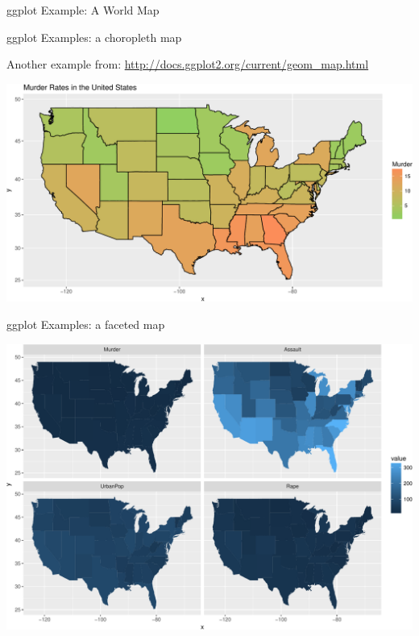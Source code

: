 \documentclass[10pt,ignorenonframetext,]{beamer}
\begin{document}
\begin{frame}[fragile]{ggplot Example: A World Map}
\normalsize

\end{frame}

\begin{frame}{ggplot Examples: a choropleth map}

Another example from:
\url{http://docs.ggplot2.org/current/geom_map.html}

\begin{center}\includegraphics[width=1\linewidth]{SpatialDataLecture_files/figure-beamer/unnamed-chunk-41-1} \end{center}

\end{frame}

\begin{frame}{ggplot Examples: a faceted map}

\begin{center}\includegraphics[width=1\linewidth]{SpatialDataLecture_files/figure-beamer/unnamed-chunk-42-1} \end{center}

\end{frame}
\end{document}
